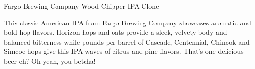 \begin{recipie}{Fargo Brewing Company Wood Chipper IPA Clone}

\begin{aboutblock}
This classic American IPA from Fargo Brewing Company showcases aromatic and bold
hop flavors. Horizon hops and oats provide a sleek, velvety body and balanced
bitterness while pounds per barrel of Cascade, Centennial, Chinook and Simcoe hops
give this IPA waves of citrus and pine flavors. That's one delicious beer eh? Oh
yeah, you betcha!
\end{aboutblock}


\begin{methodandtiming}
 
\begin{mashsteps}
\end{mashsteps}

\end{methodandtiming}

\pagebreak

\begin{ingredientsblock}

\begin{malts}
\end{malts}

\begin{hops}
\end{hops}


\end{ingredientsblock}

\end{recipie}

